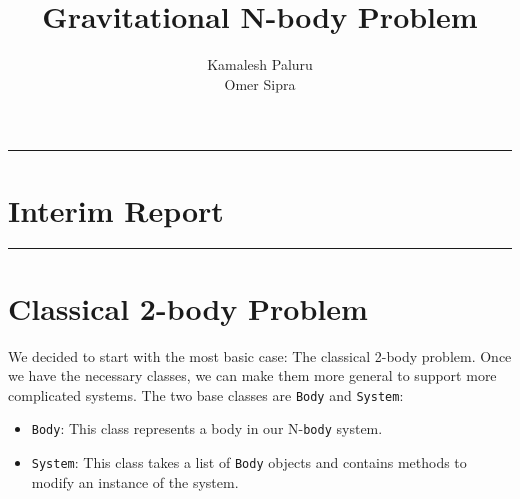 \documentclass[hidelinks, 11pt]{article}
\title{Gravitational N-body Problem}
\author{Kamalesh Paluru \\ Omer Sipra}
\newcommand{\psection}[1]{{
    \begin{center}
        \noindent \rule{17cm}{0.4pt}
            \section*{\LARGE #1}
        \noindent \rule{17cm}{0.4pt}
    \end{center}
}}
\newcommand{\psubsection}[1]{
    \noindent 
    \section*{#1}
}
\begin{document}
\maketitle

\newpage

\psection{Interim Report}

\psubsection{Classical 2-body Problem}

We decided to start with the most basic case: The classical 2-body problem. Once we have the necessary classes, we can make them more general to support more complicated systems. The two base classes are \texttt{Body} and \texttt{System}:

    \begin{itemize}
        \item \texttt{Body}: This class represents a body in our N-\texttt{body} system.
        \item \texttt{System}: This class takes a list of \texttt{Body} objects and contains methods to modify an instance of the system.
    \end{itemize}
\end{document}
